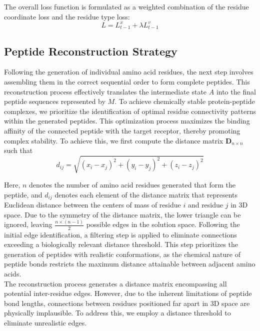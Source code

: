 The overall loss function is formulated as a weighted combination of the residue coordinate loss and the residue type loss:
$$L = L_{t-1}^x + \lambda L_{t-1}^v$$

\subsection{Peptide Reconstruction Strategy}

Following the generation of individual amino acid residues, the next step involves assembling them in the correct sequential order to form complete peptides. This reconstruction process effectively translates the intermediate state $A$ into the final peptide sequences represented by $M$. To achieve chemically stable protein-peptide complexes, we prioritize the identification of optimal residue connectivity patterns within the generated peptides. This optimization process maximizes the binding affinity of the connected peptide with the target receptor, thereby promoting complex stability. To achieve this, we first compute the distance matrix $\mathbf{D}_{n \times n}$ such that
$$d_{ij} = \sqrt{(x_i - x_j)^2 + (y_i - y_j)^2 + (z_i - z_j)^2}$$

Here, $n$ denotes the number of amino acid residues generated that form the peptide, and $d_{ij}$ denotes each element of the distance matrix that represents Euclidean distance between the centers of mass of residue $i$ and residue $j$ in 3D space. Due to the symmetry of the distance matrix, the lower triangle can be ignored, leaving $\frac{n \times (n-1)}{2}$ possible edges in the solution space. Following the initial edge identification, a filtering step is applied to eliminate connections exceeding a biologically relevant distance threshold. This step prioritizes the generation of peptides with realistic conformations, as the chemical nature of peptide bonds restricts the maximum distance attainable between adjacent amino acids. \\
The reconstruction process generates a distance matrix encompassing all potential inter-residue edges. However, due to the inherent limitations of peptide bond lengths, connections between residues positioned far apart in 3D space are physically implausible. To address this, we employ a distance threshold to eliminate unrealistic edges. \\

